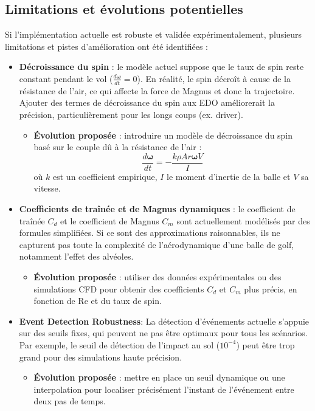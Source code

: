 \documentclass[10pt,a4paper]{report}
\begin{document}
\subsection{Limitations et évolutions potentielles}
\label{subsec:limitations_ode}

Si l'implémentation actuelle est robuste et validée expérimentalement, plusieurs limitations et pistes d'amélioration ont été identifiées :

\begin{itemize}
    \item \textbf{Décroissance du spin} : le modèle actuel suppose que le taux de spin reste constant pendant le vol (\( \frac{d\boldsymbol{\omega}}{dt} = 0 \)). En réalité, le spin décroît à cause de la résistance de l'air, ce qui affecte la force de Magnus et donc la trajectoire. Ajouter des termes de décroissance du spin aux EDO améliorerait la précision, particulièrement pour les longs coups (ex. driver).
    \begin{itemize}
        \item \textbf{Évolution proposée} : introduire un modèle de décroissance du spin basé sur le couple dû à la résistance de l'air :
        \[
        \frac{d\boldsymbol{\omega}}{dt} = -\frac{k \rho A r \boldsymbol{\omega} V}{I}
        \]
        où \( k \) est un coefficient empirique, \( I \) le moment d'inertie de la balle et \( V \) sa vitesse.
    \end{itemize}

    \item \textbf{Coefficients de traînée et de Magnus dynamiques} : le coefficient de traînée \( C_d \) et le coefficient de Magnus \( C_m \) sont actuellement modélisés par des formules simplifiées. Si ce sont des approximations raisonnables, ils ne capturent pas toute la complexité de l'aérodynamique d'une balle de golf, notamment l'effet des alvéoles.
    \begin{itemize}
        \item \textbf{Évolution proposée} : utiliser des données expérimentales ou des simulations CFD pour obtenir des coefficients \( C_d \) et \( C_m \) plus précis, en fonction de \( \text{Re} \) et du taux de spin.
    \end{itemize}

    \item \textbf{Event Detection Robustness}:
    La détection d'événements actuelle s'appuie sur des seuils fixes, qui peuvent ne pas être optimaux pour tous les scénarios. Par exemple, le seuil de détection de l'impact au sol (\( 10^{-4} \)) peut être trop grand pour des simulations haute précision.
    \begin{itemize}
        \item \textbf{Évolution proposée} : mettre en place un seuil dynamique ou une interpolation pour localiser précisément l'instant de l'événement entre deux pas de temps.
    \end{itemize}


\end{itemize}
\end{document}

